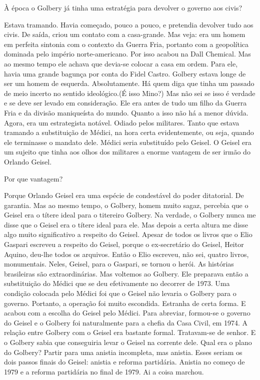  À época o Golbery já tinha uma estratégia para devolver o governo aos
civis?

 Estava tramando. Havia começado, pouco a pouco, e pretendia devolver
tudo aos civis. De saída, criou um contato com a casa-grande. Mas veja:
era um homem em perfeita sintonia com o contexto da Guerra Fria,
portanto com a geopolítica dominada pelo império norte-americano. Por
isso acabou na Dall Chemical. Mas ao mesmo tempo ele achava que devia-se
colocar a casa em ordem. Para ele, havia uma grande bagunça por conta do
Fidel Castro. Golbery estava longe de ser um homem de esquerda.
Absolutamente. Há quem diga que tinha um passado de meio incerto no
sentido ideológico.(É isso Mino?) Mas não sei se isso é verdade e se
deve ser levado em consideração. Ele era antes de tudo um filho da
Guerra Fria e da divisão maniqueísta do mundo. Quanto a isso não há a
menor dúvida. Agora, era um estrategista notável. Odiado pelos
militares. Tanto que estava tramando a substituição de Médici, na hora
certa evidentemente, ou seja, quando ele terminasse o mandato dele.
Médici seria substituído pelo Geisel. O Geisel era um sujeito que tinha
aos olhos dos militares a enorme vantagem de ser irmão do Orlando
Geisel.

 Por que vantagem?

 Porque Orlando Geisel era uma espécie de condestável do poder
ditatorial. De garantia. Mas ao mesmo tempo, o Golbery, homem muito
sagaz, percebia que o Geisel era o títere ideal para o titereiro
Golbery. Na verdade, o Golbery nunca me disse que o Geisel era o títere
ideal para ele. Mas depois a certa altura me disse algo muito
significativo a respeito do Geisel. Apesar de todos os livros que o Elio
Gaspari escreveu a respeito do Geisel, porque o ex-secretário do Geisel,
Heitor Aquino, deu-lhe todos os arquivos. Então o Elio escreveu, não
sei, quatro livros, monumentais. Neles, Geisel, para o Gaspari, se
tornou o herói. As histórias brasileiras são extraordinárias. Mas
voltemos ao Golbery. Ele preparava então a substituição do Médici que se
deu efetivamente no decorrer de 1973. Uma condição colocada pelo Médici
foi que o Geisel não levaria o Golbery para o governo. Portanto, a
operação foi muito escondida. Estranha de certa forma. E acabou com a
escolha do Geisel pelo Médici. Para abreviar, formou-se o governo do
Geisel e o Golbery foi naturalmente para a chefia da Casa Civil, em
1974. A relação entre Golbery com o Geisel era bastante formal.
Tratavam-se de senhor. E o Golbery sabia que conseguiria levar o Geisel
na corrente dele. Qual era o plano do Golbery? Partir para uma anistia
incompleta, mas anistia. Esses seriam os dois passos finais do Geisel:
anistia e reforma partidária. Anistia no começo de 1979 e a reforma
partidária no final de 1979. Ai a coisa marchou.

